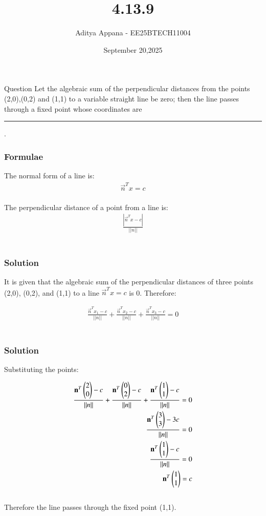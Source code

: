 \documentclass{beamer}
\title %
{4.13.9}
\date{September 20,2025}
\author %
{Aditya Appana - EE25BTECH11004}
\begin{document}
\frame{\titlepage}
\begin{frame}{Question}
Let the algebraic sum of the perpendicular distances from the points (2,0),(0,2) and
(1,1) to a variable straight line be zero; then the line passes through a fixed point
whose coordinates are \rule{1.5cm}{0.15mm}.
\end{frame}



\begin{frame}[fragile]
    \frametitle{Formulae}
The normal form of a line is:
\begin{align}
\vec{n}^Tx = c
\end{align}\\
The perpendicular distance of a point from a line is:
\begin{align}
\frac{|\vec{n}^Tx - c|}{||n||}
\end{align}\\

\end{frame}

\begin{frame}[fragile]
    \frametitle{Solution}
It is given that the algebraic sum of the perpendicular distances of three points (2,0), (0,2), and (1,1) to a line $\vec{n}^Tx = c$ is 0. Therefore:

\begin{align}
\frac{\vec{n}^Tx_1 - c}{||n||} + \frac{\vec{n}^Tx_2 - c}{||n||} + \frac{\vec{n}^Tx_3 - c}{||n||} = 0
\end{align}\\
\end{frame}

\begin{frame}[fragile]
\frametitle{Solution}

Substituting the points:

\begin{align}
\frac{\mathbf{n}^T\begin{pmatrix}2\\0\end{pmatrix} - c}{||n||} + \frac{\mathbf{n}^T\begin{pmatrix}0\\2\end{pmatrix} - c}{||n||} + \frac{\mathbf{n}^T\begin{pmatrix}1\\1\end{pmatrix} - c}{||n||} = 0 \\
\frac{\mathbf{n}^T\begin{pmatrix}3\\3\end{pmatrix} - 3c}{||n||} = 0 \\
\frac{\mathbf{n}^T\begin{pmatrix}1\\1\end{pmatrix} - c}{||n||} = 0 \\
\mathbf{n}^T\begin{pmatrix}1\\1\end{pmatrix} = c
\end{align}\\
Therefore the line passes through the fixed point (1,1).
\end{frame}
\end{document}
